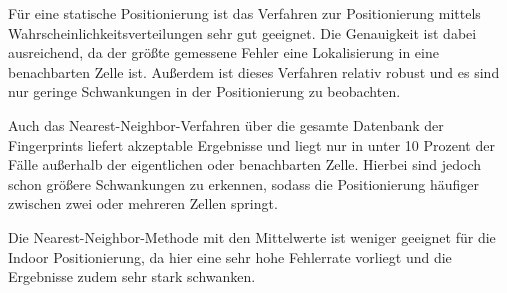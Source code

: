 Für eine statische Positionierung ist das Verfahren zur Positionierung mittels Wahrscheinlichkeitsverteilungen sehr gut geeignet. Die Genauigkeit ist dabei ausreichend, da der größte gemessene Fehler eine Lokalisierung in eine benachbarten Zelle ist. Außerdem ist dieses Verfahren relativ robust und es sind nur geringe Schwankungen in der Positionierung zu beobachten.

Auch das Nearest-Neighbor-Verfahren über die gesamte Datenbank der Fingerprints liefert akzeptable Ergebnisse und liegt nur in unter 10 Prozent der Fälle außerhalb der eigentlichen oder benachbarten Zelle. Hierbei sind jedoch schon größere Schwankungen zu erkennen, sodass die Positionierung häufiger zwischen zwei oder mehreren Zellen springt.

Die Nearest-Neighbor-Methode mit den Mittelwerte ist weniger geeignet für die Indoor Positionierung, da hier eine sehr hohe Fehlerrate vorliegt und die Ergebnisse zudem sehr stark schwanken.